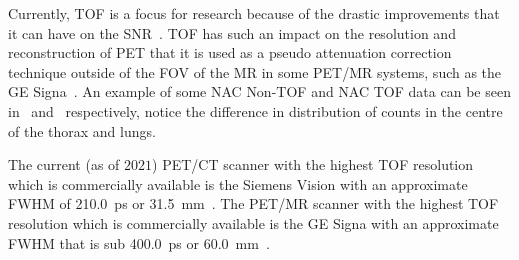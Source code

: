                Currently, \gls{TOF} is a focus for research because of the drastic improvements that it can have on the \gls{SNR}~\parencite{Lecoq2017, Cates2018}. \gls{TOF} has such an impact on the resolution and reconstruction of \gls{PET} that it is used as a pseudo attenuation correction technique outside of the \gls{FOV} of the \gls{MR} in some \gls{PET}/\gls{MR} systems, such as the \gls{GE} Signa~\parencite{Pan2019}. %
                An example of some \gls{NAC} \gls{Non-TOF} and \gls{NAC} \gls{TOF} data can be seen in~ and~ respectively, notice the difference in distribution of counts in the centre of the thorax and lungs.
                
                The current (as of $2021$) \gls{PET}/\gls{CT} scanner with the highest \gls{TOF} resolution which is commercially available is the Siemens Vision with an approximate \gls{FWHM} of \SI{210.0}{\pico\second} or \SI{31.5}{\milli\metre}~\parencite{VanSluis2019}. The \gls{PET}/\gls{MR} scanner with the highest \gls{TOF} resolution which is commercially available is the \gls{GE} Signa with an approximate \gls{FWHM} that is sub \SI{400.0}{\pico\second} or \SI{60.0}{\milli\metre}~\parencite{SIGNA, Hsu2017StudiesSystem, Caribe2019NEMAIsotopes}. %
            
